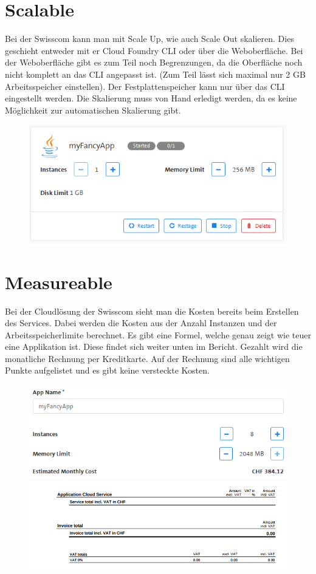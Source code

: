 \section{Scalable}
Bei der Swisscom kann man mit Scale Up, wie auch Scale Out skalieren. Dies geschieht entweder mit er Cloud Foundry CLI oder über die Weboberfläche. Bei der Weboberfläche gibt es zum Teil noch Begrenzungen, da die Oberfläche noch nicht komplett an das CLI angepasst ist. (Zum Teil lässt sich maximal nur 2 GB Arbeitsspeicher einstellen). Der Festplattenspeicher kann nur über das CLI eingestellt werden. Die Skalierung muss von Hand erledigt werden, da es keine Möglichkeit zur automatischen Skalierung gibt.
\begin{figure}[H]
\centering
\includegraphics[scale=0.5]{images/image09.png} 
\end{figure}

\section{Measureable}
Bei der Cloudlösung der Swisscom sieht man die Kosten bereits beim Erstellen des Services. Dabei werden die Kosten aus der Anzahl Instanzen und der Arbeitsspeicherlimite berechnet. Es gibt eine Formel, welche genau zeigt wie teuer eine Applikation ist. Diese findet sich weiter unten im Bericht.
Gezahlt wird die monatliche Rechnung per Kreditkarte. Auf der Rechnung sind alle wichtigen Punkte aufgelistet und es gibt keine versteckte Kosten.
\begin{figure}[H]
\centering
\includegraphics[scale=0.5]{images/image07.png} 
\includegraphics[scale=0.5]{images/image05.png} 
\end{figure}
